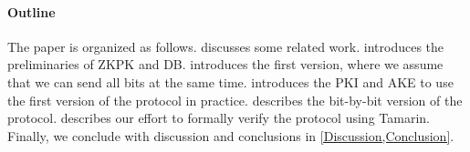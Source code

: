 \paragraph*{Outline}

The paper is organized as follows.
 discusses some related work.
 introduces the preliminaries of \ac{ZKPK} and \ac{DB}.
 introduces the first version, where we assume that we can 
send all bits at the same time.
 introduces the \ac{PKI} and \ac{AKE} to use the first 
version of the protocol in practice.
 describes the bit-by-bit version of the protocol.
 describes our effort to formally verify the protocol 
using Tamarin.
Finally, we conclude with discussion and conclusions in 
\cref{Discussion,Conclusion}.
